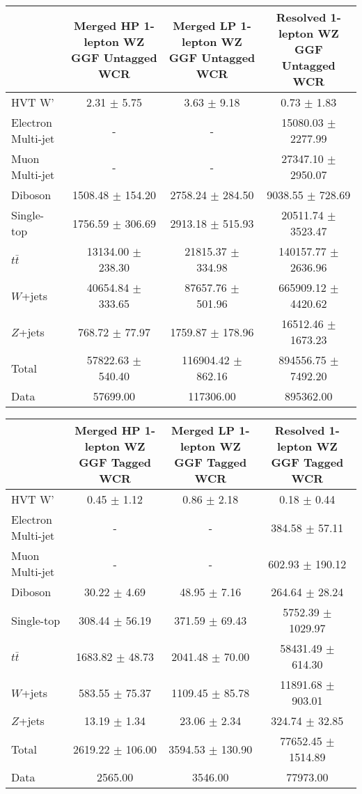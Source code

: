 
\begin{tabular}{|l|c|c|c|}
\hline
	  &	Merged HP 1-lepton WZ GGF Untagged WCR &	Merged LP 1-lepton WZ GGF Untagged WCR &	Resolved 1-lepton WZ GGF Untagged WCR \\\hline 
	HVT W' &	2.31 $\pm$ 5.75 &	3.63 $\pm$ 9.18 &	0.73 $\pm$ 1.83 \\\hline 
	Electron Multi-jet &	- &	- &	15080.03 $\pm$ 2277.99 \\\hline 
	Muon Multi-jet &	- &	- &	27347.10 $\pm$ 2950.07 \\\hline 
	Diboson &	1508.48 $\pm$ 154.20 &	2758.24 $\pm$ 284.50 &	9038.55 $\pm$ 728.69 \\\hline 
	Single-top &	1756.59 $\pm$ 306.69 &	2913.18 $\pm$ 515.93 &	20511.74 $\pm$ 3523.47 \\\hline 
	$t\bar{t}$ &	13134.00 $\pm$ 238.30 &	21815.37 $\pm$ 334.98 &	140157.77 $\pm$ 2636.96 \\\hline 
	$W$+jets &	40654.84 $\pm$ 333.65 &	87657.76 $\pm$ 501.96 &	665909.12 $\pm$ 4420.62 \\\hline 
	$Z$+jets &	768.72 $\pm$ 77.97 &	1759.87 $\pm$ 178.96 &	16512.46 $\pm$ 1673.23 \\\hline 
	Total &	57822.63 $\pm$ 540.40 &	116904.42 $\pm$ 862.16 &	894556.75 $\pm$ 7492.20 \\\hline 
	Data &	57699.00 &	117306.00 &	895362.00 \\\hline 
\end{tabular}

\begin{tabular}{|l|c|c|c|}
\hline
	  &	Merged HP 1-lepton WZ GGF Tagged WCR &	Merged LP 1-lepton WZ GGF Tagged WCR &	Resolved 1-lepton WZ GGF Tagged WCR \\\hline 
	HVT W' &	0.45 $\pm$ 1.12 &	0.86 $\pm$ 2.18 &	0.18 $\pm$ 0.44 \\\hline 
	Electron Multi-jet &	- &	- &	384.58 $\pm$ 57.11 \\\hline 
	Muon Multi-jet &	- &	- &	602.93 $\pm$ 190.12 \\\hline 
	Diboson &	30.22 $\pm$ 4.69 &	48.95 $\pm$ 7.16 &	264.64 $\pm$ 28.24 \\\hline 
	Single-top &	308.44 $\pm$ 56.19 &	371.59 $\pm$ 69.43 &	5752.39 $\pm$ 1029.97 \\\hline 
	$t\bar{t}$ &	1683.82 $\pm$ 48.73 &	2041.48 $\pm$ 70.00 &	58431.49 $\pm$ 614.30 \\\hline 
	$W$+jets &	583.55 $\pm$ 75.37 &	1109.45 $\pm$ 85.78 &	11891.68 $\pm$ 903.01 \\\hline 
	$Z$+jets &	13.19 $\pm$ 1.34 &	23.06 $\pm$ 2.34 &	324.74 $\pm$ 32.85 \\\hline 
	Total &	2619.22 $\pm$ 106.00 &	3594.53 $\pm$ 130.90 &	77652.45 $\pm$ 1514.89 \\\hline 
	Data &	2565.00 &	3546.00 &	77973.00 \\\hline 
\end{tabular}

